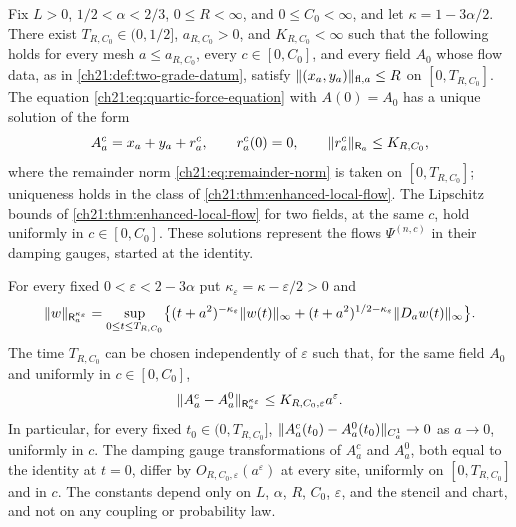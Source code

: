 \begin{theorem}\label{ch21:thm:common-enhancement-alternative-flow}
Fix $L>0$, $1/2<\alpha<2/3$, $0\le R<\infty$, and $0\le C_0<\infty$, and let $\kappa=1-3\alpha/2$. There exist $T_{R,C_0}\in(0,1/2]$, $a_{R,C_0}>0$, and $K_{R,C_0}<\infty$ such that the following holds for every mesh $a\le a_{R,C_0}$, every $c\in[0,C_0]$, and every field $A_0$ whose flow data, as in \cref{ch21:def:two-grade-datum}, satisfy $\lVert (x_a,y_a)\rVert_{\mathrm{fl},a}\le R$ on $[0,T_{R,C_0}]$. The equation \eqref{ch21:eq:quartic-force-equation} with $A(0)=A_0$ has a unique solution of the form
\[
 A_a^c=x_a+y_a+r_a^c,\qquad r_a^c(0)=0,\qquad\lVert r_a^c\rVert_{\mathsf R_a}\le K_{R,C_0},
\]
where the remainder norm \eqref{ch21:eq:remainder-norm} is taken on $[0,T_{R,C_0}]$; uniqueness holds in the class of \cref{ch21:thm:enhanced-local-flow}. The Lipschitz bounds of \cref{ch21:thm:enhanced-local-flow} for two fields, at the same $c$, hold uniformly in $c\in[0,C_0]$. These solutions represent the flows $\Psi^{(n,c)}$ in their damping gauges, started at the identity.

For every fixed $0<\varepsilon<2-3\alpha$ put $\kappa_\varepsilon=\kappa-\varepsilon/2>0$ and
\[
 \lVert w\rVert_{\mathsf R_a^{\kappa_\varepsilon}}=\sup_{0\le t\le T_{R,C_0}}\bigl\{(t+a^2)^{-\kappa_\varepsilon}\lVert w(t)\rVert_\infty+(t+a^2)^{1/2-\kappa_\varepsilon}\lVert D_aw(t)\rVert_\infty\bigr\}.
\]
The time $T_{R,C_0}$ can be chosen independently of $\varepsilon$ such that, for the same field $A_0$ and uniformly in $c\in[0,C_0]$,
\begin{equation}\label{ch21:eq:quartic-early-comparison}
 \lVert A_a^c-A_a^0\rVert_{\mathsf R_a^{\kappa_\varepsilon}}\le K_{R,C_0,\varepsilon}a^\varepsilon .
\end{equation}
In particular, for every fixed $t_0\in(0,T_{R,C_0}]$, $\lVert A^c_a(t_0)-A^0_a(t_0)\rVert_{C_a^1}\to0$ as $a\to0$, uniformly in $c$. The damping gauge transformations of $A^c_a$ and $A^0_a$, both equal to the identity at $t=0$, differ by $O_{R,C_0,\varepsilon}(a^\varepsilon)$ at every site, uniformly on $[0,T_{R,C_0}]$ and in $c$. The constants depend only on $L$, $\alpha$, $R$, $C_0$, $\varepsilon$, and the stencil and chart, and not on any coupling or probability law.
\end{theorem}

